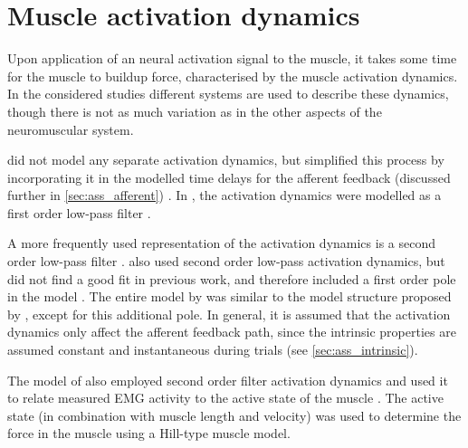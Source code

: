 \section{Muscle activation dynamics}
\label{sec:muscle_act_dyn}
Upon application of an neural activation signal to the muscle, it takes some time for the muscle to buildup force, characterised by the muscle activation dynamics. In the considered studies different systems are used to describe these dynamics, though there is not as much variation as in the other aspects of the neuromuscular system. 

\citeauthor{zhang_simultaneous_1997} did not model any separate activation dynamics, but simplified this process by incorporating it in the modelled time delays for the afferent feedback (discussed further in \autoref{sec:ass_afferent}) \cite{zhang_simultaneous_1997}. In \citeauthor{van_der_helm_identification_2002}, the activation dynamics were modelled as a first order low-pass filter \cite{van_der_helm_identification_2002}. 

A more frequently used representation of the activation dynamics is a second order low-pass filter \cite{schouten_nmclab_2008, mugge_rigorous_2010}. \citeauthor{mirbagheri_intrinsic_2000} also used second order low-pass activation dynamics, but did not find a good fit in previous work, and therefore included a first order pole in the model \cite{mirbagheri_intrinsic_2000, mirbagheri_parametric_1995}. The entire model by \citeauthor{mirbagheri_intrinsic_2000} was similar to the model structure proposed by \citeauthor{kearney_identification_1997}, except for this additional pole. In general, it is assumed that the activation dynamics only affect the afferent feedback path, since the intrinsic properties are assumed constant and instantaneous during trials (see \autoref{sec:ass_intrinsic}). 

The model of \citeauthor{de_gooijer-van_de_groep_estimation_2016} also employed second order filter activation dynamics and used it to relate measured EMG activity to the active state of the muscle \cite{de_gooijer-van_de_groep_estimation_2016}. The active state (in combination with muscle length and velocity) was used to determine the force in the muscle using a Hill-type muscle model. 


